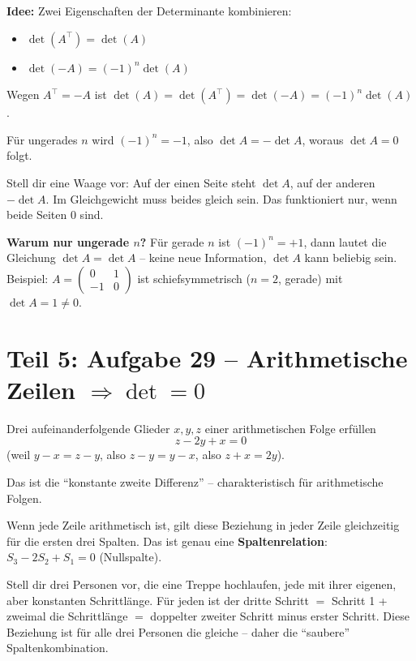\documentclass[a4paper,12pt]{article}
\begin{document}
\textbf{Idee:} Zwei Eigenschaften der Determinante kombinieren:
\begin{itemize}[nosep]
    \item $\det(A^\top) = \det(A)$
    \item $\det(-A) = (-1)^n \det(A)$
\end{itemize}

Wegen $A^\top = -A$ ist $\det(A) = \det(A^\top) = \det(-A) = (-1)^n \det(A)$.

F\"ur ungerades $n$ wird $(-1)^n = -1$, also $\det A = -\det A$, woraus $\det A = 0$ folgt.

\begin{analogie}
Stell dir eine Waage vor: Auf der einen Seite steht $\det A$, auf der anderen $-\det A$. Im Gleichgewicht muss beides gleich sein. Das funktioniert nur, wenn beide Seiten $0$ sind.
\end{analogie}

\textbf{Warum nur ungerade $n$?} F\"ur gerade $n$ ist $(-1)^n = +1$, dann lautet die Gleichung $\det A = \det A$ -- keine neue Information, $\det A$ kann beliebig sein. Beispiel: $A = \begin{pmatrix} 0 & 1 \\ -1 & 0 \end{pmatrix}$ ist schiefsymmetrisch ($n=2$, gerade) mit $\det A = 1 \neq 0$.

\newpage

\part*{Teil 5: Aufgabe 29 -- Arithmetische Zeilen $\Rightarrow \det = 0$}

\begin{merkbox}[title={Schl\"usseleigenschaft arithmetischer Folgen}]
Drei aufeinanderfolgende Glieder $x, y, z$ einer arithmetischen Folge erf\"ullen
\[
z - 2y + x = 0
\]
(weil $y - x = z - y$, also $z - y = y - x$, also $z + x = 2y$).

\medskip
Das ist die ``konstante zweite Differenz'' -- charakteristisch f\"ur arithmetische Folgen.
\end{merkbox}

Wenn jede Zeile arithmetisch ist, gilt diese Beziehung in jeder Zeile gleichzeitig f\"ur die ersten drei Spalten. Das ist genau eine \textbf{Spaltenrelation}: $S_3 - 2 S_2 + S_1 = 0$ (Nullspalte).

\begin{analogie}
Stell dir drei Personen vor, die eine Treppe hochlaufen, jede mit ihrer eigenen, aber konstanten Schrittl\"ange. F\"ur jeden ist der dritte Schritt $=$ Schritt 1 + zweimal die Schrittl\"ange $=$ doppelter zweiter Schritt minus erster Schritt. Diese Beziehung ist f\"ur alle drei Personen die gleiche -- daher die ``saubere'' Spaltenkombination.
\end{analogie}
\end{document}
